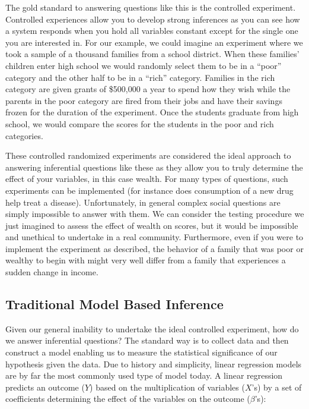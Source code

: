 \documentclass[]{memoir}
\begin{document}
The gold standard to answering questions like this is the controlled
experiment. Controlled experiences allow you to develop strong
inferences as you can see how a system responds when you hold all
variables constant except for the single one you are interested in. For
our example, we could imagine an experiment where we took a sample of a
thousand families from a school district. When these families' children
enter high school we would randomly select them to be in a ``poor''
category and the other half to be in a ``rich'' category. Families in
the rich category are given grants of \$500,000 a year to spend how they
wish while the parents in the poor category are fired from their jobs
and have their savings frozen for the duration of the experiment. Once
the students graduate from high school, we would compare the scores for
the students in the poor and rich categories.

These controlled randomized experiments are considered the ideal
approach to answering inferential questions like these as they allow you
to truly determine the effect of your variables, in this case wealth.
For many types of questions, such experiments can be implemented (for
instance does consumption of a new drug help treat a disease).
Unfortunately, in general complex social questions are simply impossible
to answer with them. We can consider the testing procedure we just
imagined to assess the effect of wealth on scores, but it would be
impossible and unethical to undertake in a real community. Furthermore,
even if you were to implement the experiment as described, the behavior
of a family that was poor or wealthy to begin with might very well
differ from a family that experiences a sudden change in income.

\subsection{Traditional Model Based Inference}

Given our general inability to undertake the ideal controlled
experiment, how do we answer inferential questions? The standard way is
to collect data and then construct a model enabling us to measure the
statistical significance of our hypothesis given the data. Due to
history and simplicity, linear regression models are by far the most
commonly used type of model today. A linear regression predicts an
outcome ($Y$) based on the multiplication of variables ($X$'s) by a set
of coefficients determining the effect of the variables on the outcome
($\beta$'s):
\end{document}
